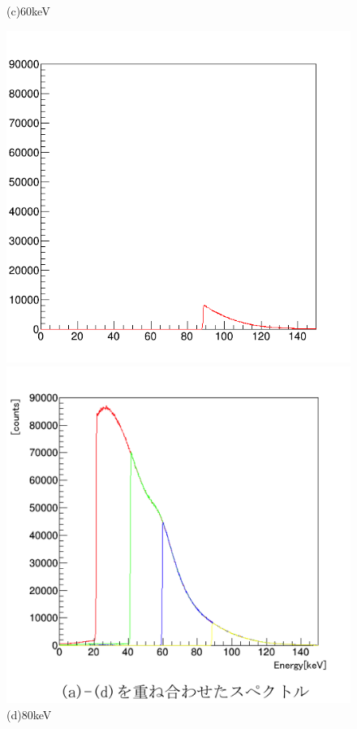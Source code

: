 \begin{figure}[H]
\begin{minipage}{0.5\hsize}
\begin{center}
  \end{center}
  \vspace{-1cm}
\caption*{(c)60keV}
 \end{minipage}
 \begin{minipage}{0.5\hsize}
  \begin{center}
     \includegraphics[bb=0.000000 0.000000 596.000000 574.000000,width=1.0\hsize]{image2/chapter5/120kV_0.1mA_90keV_100sec.png}
  \end{center}
 \vspace{-1cm}
\caption*{(d)80keV}
 \end{minipage}
 \begin{minipage}{0.5\hsize}
 \hspace{3cm} 
     \includegraphics[bb=0.000000 0.000000 598.510523 586.031555,width=1.0\hsize]{image2/chapter5/120kV_0.1mA_V_100sec_multi.png}

\end{minipage}
\end{figure}
